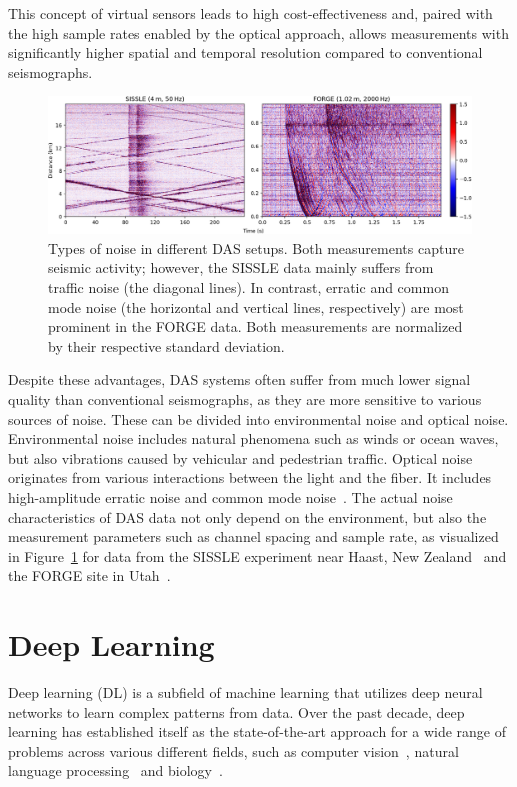 This concept of virtual sensors leads to high cost-effectiveness and, paired with the high sample rates enabled by the optical approach, allows measurements with significantly higher spatial and temporal resolution compared to conventional seismographs.
\begin{figure}[b!]
    \includegraphics[width=\textwidth]{img/fig_2.2.png}
    \caption{
        Types of noise in different DAS setups.
        Both measurements capture seismic activity; however, the SISSLE data mainly suffers from traffic noise (the diagonal lines).
        In contrast, erratic and common mode noise (the horizontal and vertical lines, respectively) are most prominent in the FORGE data.
        Both measurements are normalized by their respective standard deviation.
    }\label{fig:das-noise}
\end{figure}
Despite these advantages, DAS systems often suffer from much lower signal quality than conventional seismographs, as they are more sensitive to various sources of noise.
These can be divided into environmental noise and optical noise.
Environmental noise includes natural phenomena such as winds or ocean waves, but also vibrations caused by vehicular and pedestrian traffic.
Optical noise originates from various interactions between the light and the fiber.
It includes high-amplitude erratic noise and common mode noise~\cite{IDF}.
The actual noise characteristics of DAS data not only depend on the environment, but also the measurement parameters such as channel spacing and sample rate, as visualized in Figure~\ref{fig:das-noise} for data from the SISSLE experiment near Haast, New Zealand~\cite{SISSLE} and the FORGE site in Utah~\cite{FORGE}.

\section{Deep Learning}

Deep learning (DL) is a subfield of machine learning that utilizes deep neural networks to learn complex patterns from data. 
Over the past decade, deep learning has established itself as the state-of-the-art approach for a wide range of problems across various different fields, such as computer vision~\cite{AlexNet}, natural language processing~\cite{GPT3} and biology~\cite{AlphaFold}.

